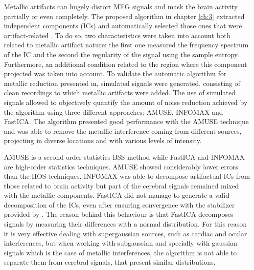 
Metallic artifacts can hugely distort MEG signals and mask the brain activity partially or even completely. The proposed algorithm in chapter \ref{ch:3} extracted independent components (ICs) and automatically selected those ones that were artifact-related \citep{Migliorelli2015}. To do so, two characteristics were taken into account both related to metallic artifact nature: the first one measured the frequency spectrum of the IC and the second the regularity of the signal using the sample entropy. Furthermore, an additional condition related to the region where this component projected was taken into account. To validate the automatic algorithm for metallic reduction presented in, simulated signals were generated, consisting of clean recordings to which metallic artifacts were added. The use of simulated signals allowed to objectively quantify the amount of noise reduction achieved by the algorithm using three different approaches: AMUSE, INFOMAX and FastICA. The algorithm presented good performance with the AMUSE technique and was able to remove the metallic interference coming from different sources, projecting in diverse locations and with various levels of intensity. 

AMUSE is a second-order statistics BSS method while FastICA and INFOMAX are high-order statistics techniques. AMUSE showed considerably lower errors than the HOS techniques. INFOMAX was able to decompose artifactual ICs from those related to brain activity but part of the cerebral signals remained mixed with the metallic components. FastICA did not manage to generate a valid decomposition of the ICs, even after ensuring convergence with the stabilizer provided by \citep{Hyvarinen1999}. The reason behind this behaviour is that FastICA decomposes signals by measuring their differences with a normal distribution. For this reason it is very effective dealing with supergaussian sources, such as cardiac and ocular interferences, but when working with subgaussian and specially with gaussian signals which is the case of metallic interferences, the algorithm is not able to separate them from cerebral signals, that present similar distributions. 

